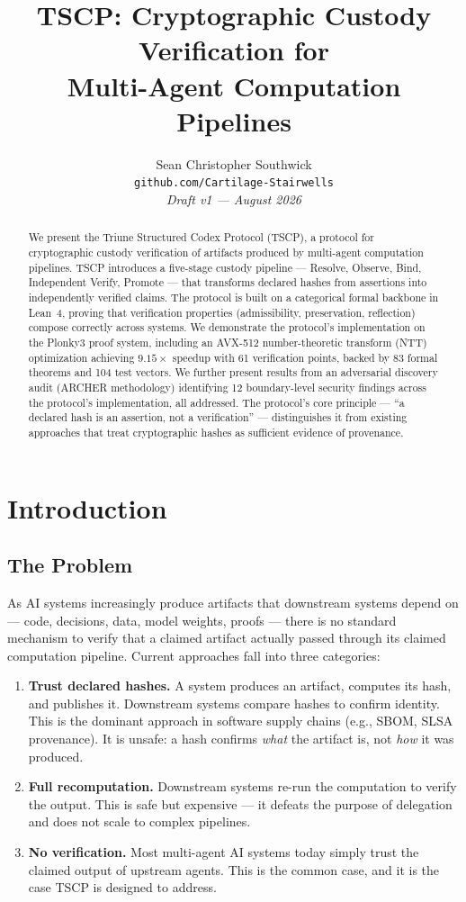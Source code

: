 \documentclass[11pt,a4paper]{article}
\title{\textbf{TSCP: Cryptographic Custody Verification for\\Multi-Agent Computation Pipelines}}
\author{Sean Christopher Southwick\\
\texttt{github.com/Cartilage-Stairwells}\\
\textit{Draft v1 --- August 2026}}
\date{}
\begin{document}
\maketitle

\begin{abstract}
We present the Triune Structured Codex Protocol (TSCP), a protocol for cryptographic custody verification of artifacts produced by multi-agent computation pipelines. TSCP introduces a five-stage custody pipeline --- Resolve, Observe, Bind, Independent Verify, Promote --- that transforms declared hashes from assertions into independently verified claims. The protocol is built on a categorical formal backbone in Lean~4, proving that verification properties (admissibility, preservation, reflection) compose correctly across systems. We demonstrate the protocol's implementation on the Plonky3 proof system, including an AVX-512 number-theoretic transform (NTT) optimization achieving $9.15\times$ speedup with 61 verification points, backed by 83 formal theorems and 104 test vectors. We further present results from an adversarial discovery audit (ARCHER methodology) identifying 12 boundary-level security findings across the protocol's implementation, all addressed. The protocol's core principle --- ``a declared hash is an assertion, not a verification'' --- distinguishes it from existing approaches that treat cryptographic hashes as sufficient evidence of provenance.
\end{abstract}

\section{Introduction}

\subsection{The Problem}

As AI systems increasingly produce artifacts that downstream systems depend on --- code, decisions, data, model weights, proofs --- there is no standard mechanism to verify that a claimed artifact actually passed through its claimed computation pipeline. Current approaches fall into three categories:

\begin{enumerate}
\item \textbf{Trust declared hashes.} A system produces an artifact, computes its hash, and publishes it. Downstream systems compare hashes to confirm identity. This is the dominant approach in software supply chains (e.g., SBOM, SLSA provenance). It is unsafe: a hash confirms \emph{what} the artifact is, not \emph{how} it was produced.
\item \textbf{Full recomputation.} Downstream systems re-run the computation to verify the output. This is safe but expensive --- it defeats the purpose of delegation and does not scale to complex pipelines.
\item \textbf{No verification.} Most multi-agent AI systems today simply trust the claimed output of upstream agents. This is the common case, and it is the case TSCP is designed to address.
\end{enumerate}
\end{document}
